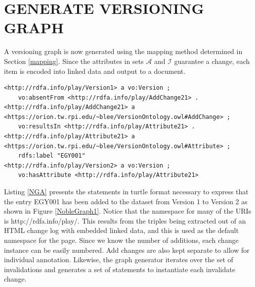 \section{GENERATE VERSIONING GRAPH}

A versioning graph is now generated using the mapping method determined in Section \ref{mapping}.
Since the attributes in sets \(\mathcal{A}\) and \(\mathcal{I}\) guarantee a change, each item is encoded into linked data and output to a document.

\begin{lstlisting}[language=SPARQL, caption=Noble Gas Add in Turtle, label=NGA]
<http://rdfa.info/play/Version1> a vo:Version ;
	vo:absentFrom <http://rdfa.info/play/AddChange21> .
<http://rdfa.info/play/AddChange21> a <https://orion.tw.rpi.edu/~blee/VersionOntology.owl#AddChange> ;
	vo:resultsIn <http://rdfa.info/play/Attribute21> .
<http://rdfa.info/play/Attribute21> a <https://orion.tw.rpi.edu/~blee/VersionOntology.owl#Attribute> ;
	rdfs:label "EGY001"
<http://rdfa.info/play/Version2> a vo:Version ;
	vo:hasAttribute <http://rdfa.info/play/Attribute21>
\end{lstlisting}
Listing \ref{NGA} presents the statements in turtle format necessary to express that the entry EGY001 has been added to the dataset from Version 1 to Version 2 as shown in Figure \ref{NobleGraph1}.
Notice that the namespace for many of the URIs is \textlangle http://rdfa.info/play/\textrangle.
This results from the triples being extracted out of an HTML change log with embedded linked data, and this is used as the default namespace for the page.
Since we know the number of additions, each change instance can be easily numbered.
Add changes are also kept separate to allow for individual annotation.
Likewise, the graph generator iterates over the set of invalidations and generates a set of statements to instantiate each invalidate change.

